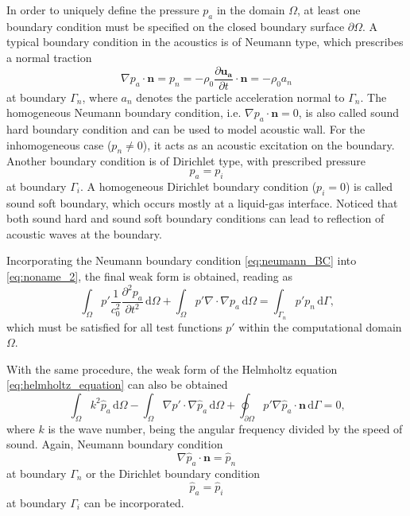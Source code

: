 In order to uniquely define the pressure $p_a$ in the domain $\Omega$, at least one boundary condition must be specified on the closed boundary surface $\partial \Omega$. A typical boundary condition in the acoustics is of Neumann type, which prescribes a normal traction
\begin{equation}
	\nabla p_a \cdot \boldsymbol{n} = p_n = -\rho_0\frac{\partial \boldsymbol{u_a}}{\partial t}\cdot\boldsymbol{n} = -\rho_0 a_n \label{eq:neumann_BC}
\end{equation}
at boundary $\Gamma_n$, where $a_n$ denotes the particle acceleration normal to $\Gamma_n$. The homogeneous Neumann boundary condition, i.e. $\nabla p_a \cdot \boldsymbol{n} = 0$, is also called sound hard boundary condition and can be used to model acoustic wall. For the inhomogeneous case ($p_n \neq 0$), it acts as an acoustic excitation on the boundary. Another boundary condition is of Dirichlet type, with prescribed pressure
\begin{equation}
	p_a = p_i \label{eq:dirichlet_BC}
\end{equation}
at boundary $\Gamma_i$. A homogeneous Dirichlet boundary condition ($p_i = 0$) is called sound soft boundary, which occurs mostly at a liquid-gas interface. Noticed that both sound hard and sound soft boundary conditions can lead to reflection of acoustic waves at the boundary.

Incorporating the Neumann boundary condition \cref{eq:neumann_BC} into \cref{eq:noname_2}, the final weak form is obtained, reading as
\begin{equation}
		\int_{\Omega}p'\frac{1}{c_0^2}\frac{\partial^2 p_a}{\partial t^2}\,\text{d}\Omega + \int_{\Omega}p'\nabla\cdot\nabla p_a\,\text{d}\Omega = \int_{\Gamma_n}p'p_n\,\text{d}\Gamma\text{,}
\end{equation}
which must be satisfied for all test functions $p'$ within the computational domain $\Omega$.

With the same procedure, the weak form of the Helmholtz equation \cref{eq:helmholtz_equation} can also be obtained
\begin{equation}
	\int_{\Omega}k^2\hat{p}_a\,\text{d}\Omega - \int_{\Omega}\nabla p' \cdot \nabla\hat{p}_a\,\text{d}\Omega + \oint_{\partial\Omega} p'\nabla \hat{p}_a \cdot \boldsymbol{n}\,\text{d}\Gamma = 0 \text{,}
\end{equation}
where $k$ is the wave number, being the angular frequency divided by the speed of sound. Again, Neumann boundary condition
\begin{equation}
	\nabla\hat{p}_a \cdot\boldsymbol{n} = \hat{p}_n
\end{equation}
at boundary $\Gamma_n$ or the Dirichlet boundary condition
\begin{equation}
	\hat{p}_a = \hat{p}_i
\end{equation}
at boundary $\Gamma_i$ can be incorporated.
\newpage

